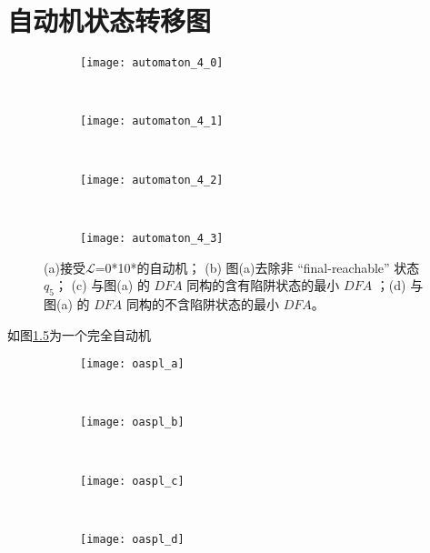 \chapter{自动机状态转移图}


\begin{figure}[!htbp]
    \centering
    \begin{subfigure}[b]{0.35\textwidth}
        \texttt{[image: automaton\_4\_0]}
        \caption{}
        \label{fig:DFA4_0}
    \end{subfigure}
    ~
    \begin{subfigure}[b]{0.35\textwidth}
        \texttt{[image: automaton\_4\_1]}
        \caption{}
        \label{fig:DFA4_1}
    \end{subfigure}
    \\
    \begin{subfigure}[b]{0.35\textwidth}
        \texttt{[image: automaton\_4\_2]}
        \caption{}
        \label{fig:DFA4_2}
    \end{subfigure}
    ~
    \begin{subfigure}[b]{0.35\textwidth}
        \texttt{[image: automaton\_4\_3]}
        \caption{}
        \label{fig:DFA4_3}
    \end{subfigure}
    \caption{(a)接受{$\mathcal{L}$}=0*10*的自动机{\cite[fig 5-4]{book1}}；  (b) 图(a)去除非 “final-reachable” 状态 {$q_5$}； (c) 与图(a) 的 $DFA$ 同构的含有陷阱状态的最小 $DFA$ ；(d) 与图(a) 的 $DFA$ 同构的不含陷阱状态的最小 $DFA$。}
    \label{fig:DFA4}
\end{figure}

如图\ref{fig:DFA4}为一个完全自动机


\begin{figure}[!htbp]
    \centering
    \begin{subfigure}[b]{0.35\textwidth}
      \texttt{[image: oaspl\_a]}
      \caption{}
      \label{fig:oaspl_a}
    \end{subfigure}%
    ~%
    \begin{subfigure}[b]{0.35\textwidth}
      \texttt{[image: oaspl\_b]}
      \caption{}
      \label{fig:oaspl_b}
    \end{subfigure}
    \\%
    \begin{subfigure}[b]{0.35\textwidth}
      \texttt{[image: oaspl\_c]}
      \caption{}
      \label{fig:oaspl_c}
    \end{subfigure}%
    ~%
    \begin{subfigure}[b]{0.35\textwidth}
      \texttt{[image: oaspl\_d]}
      \caption{}
      \label{fig:oaspl_d}
    \end{subfigure}
    \label{fig:oaspl}
\end{figure}